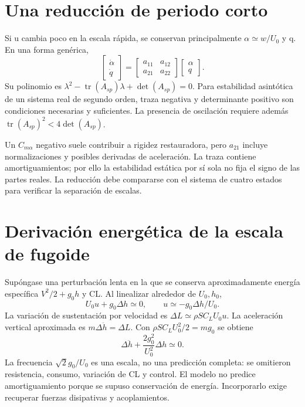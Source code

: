 \section{Una reducción de periodo corto}
Si u cambia poco en la escala rápida, se conservan principalmente $\alpha\simeq w/U_0$ y q. En una forma genérica,
\begin{equation}
\begin{bmatrix}\dot\alpha\\\dot q\end{bmatrix}
=\begin{bmatrix}a_{11}&a_{12}\\a_{21}&a_{22}\end{bmatrix}
\begin{bmatrix}\alpha\\q\end{bmatrix}.
\end{equation}
Su polinomio es $\lambda^2-\operatorname{tr}(A_{sp})\lambda+\det(A_{sp})=0$. Para estabilidad asintótica de un sistema real de segundo orden, traza negativa y determinante positivo son condiciones necesarias y suficientes. La presencia de oscilación requiere además $\operatorname{tr}(A_{sp})^2<4\det(A_{sp})$.

Un $C_{m\alpha}$ negativo suele contribuir a rigidez restauradora, pero $a_{21}$ incluye normalizaciones y posibles derivadas de aceleración. La traza contiene amortiguamientos; por ello la estabilidad estática por sí sola no fija el signo de las partes reales. La reducción debe compararse con el sistema de cuatro estados para verificar la separación de escalas.

\section{Derivación energética de la escala de fugoide}
Supóngase una perturbación lenta en la que se conserva aproximadamente energía específica $V^2/2+g_0h$ y CL. Al linealizar alrededor de $U_0,h_0$,
\begin{equation}
U_0u+g_0\Delta h\simeq0,\qquad u\simeq-g_0\Delta h/U_0.
\end{equation}
La variación de sustentación por velocidad es $\Delta L\simeq\rho SC_LU_0u$. La aceleración vertical aproximada es $m\Delta\ddot h=\Delta L$. Con $\rho SC_LU_0^2/2=mg_0$ se obtiene
\begin{equation}
\Delta\ddot h+\frac{2g_0^2}{U_0^2}\Delta h\simeq0.
\end{equation}
La frecuencia $\sqrt2g_0/U_0$ es una escala, no una predicción completa: se omitieron resistencia, consumo, variación de CL y control. El modelo no predice amortiguamiento porque se supuso conservación de energía. Incorporarlo exige recuperar fuerzas disipativas y acoplamientos.


